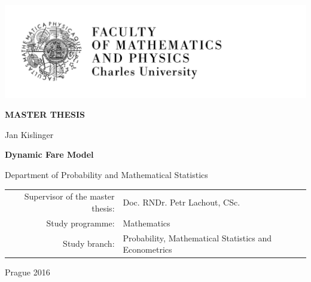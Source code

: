 \pagestyle{empty}
\hypersetup{pageanchor=false}
\begin{center}

\centerline{\mbox{\includegraphics[width=166mm]{figures/mfflogo_new.pdf}}} %

\vspace{-8mm}
\vfill

{\bf\Large MASTER THESIS}

\vfill

{\LARGE Jan Kislinger}

\vspace{15mm}

{\LARGE\bfseries Dynamic Fare Model}

\vfill

Department of Probability and Mathematical Statistics

\vfill

\begin{tabular}{rl}

Supervisor of the master thesis: & Doc. RNDr. Petr Lachout, CSc. \\
\noalign{\vspace{2mm}}
Study programme: & Mathematics \\
\noalign{\vspace{2mm}}
Study branch: & 
	\begin{minipage}[t]{220px}%
		Probability, Mathematical Statistics and Econometrics
	\end{minipage} \tabularnewline
\end{tabular}

\vfill

Prague 2016

\end{center}





\newpage

